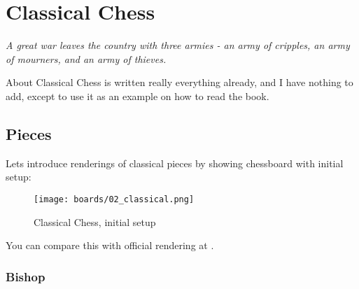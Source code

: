 

\chapter*{Classical Chess}
\label{ch:Classical Chess}

\begin{flushright}
\parbox{0.8\textwidth}{
\emph{A great war leaves the country with three armies -
an army of cripples, an army of mourners, and an army of thieves.\newline
{} } }
\end{flushright}

\noindent
About Classical Chess is written really everything already, and I have
nothing to add, except to use it as an example on how to read the book.

\clearpage %

\section*{Pieces}
\label{sec:Classical Chess/Pieces}

Lets introduce renderings of classical pieces by showing chessboard with initial
setup:

\noindent
\begin{figure}[!h]
\texttt{[image: boards/02\_classical.png]}
\caption{Classical Chess, initial setup}
\label{fig:02_classical}
\end{figure}

\noindent
You can compare this with official rendering at .

\clearpage %

\subsection*{Bishop}
\label{sec:Classical Chess/Pieces/Bishop}


